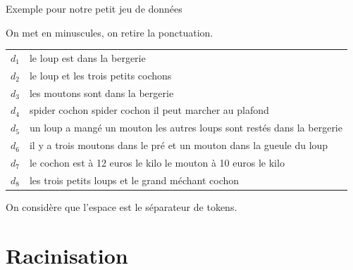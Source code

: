 \begin{frame}{Exemple pour notre petit jeu de données}

On met en minuscules, on retire la ponctuation.

\vfill

\begin{tabular}{>{\color{structure.fg}}ll}
     $d_1$&le loup est dans la bergerie\\
     $d_2$&le loup et les trois petits cochons\\
     $d_3$&les moutons sont dans la bergerie\\
     $d_4$&spider cochon spider cochon il peut marcher au plafond\\
     $d_5$&un loup a mangé un mouton les autres loups sont restés dans la bergerie\\
     $d_6$&il y a trois moutons dans le pré et un mouton dans la gueule du loup\\
     $d_7$&le cochon est à 12 euros le kilo le mouton à  10 euros le kilo\\
     $d_8$&les trois petits loups et le grand méchant cochon\\
\end{tabular}

\vfill

On considère que l'espace est le séparateur de tokens.

\end{frame}


\section{Racinisation}

